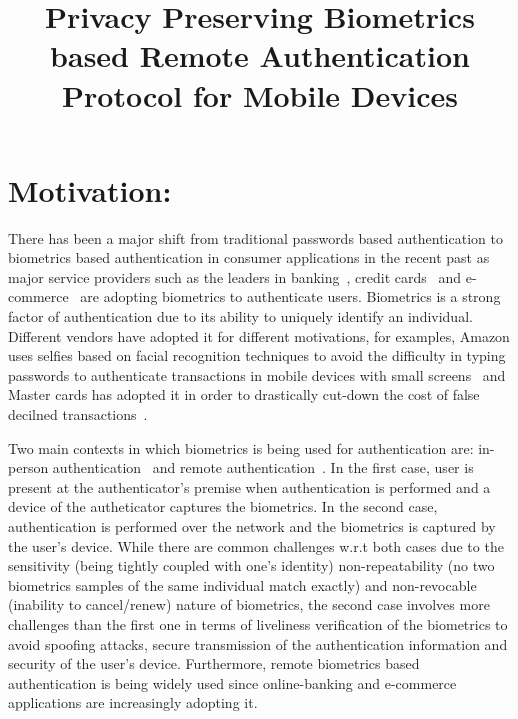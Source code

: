 \documentclass[10pt]{article}
\title{
\vspace{-20.mm}
Privacy Preserving Biometrics based Remote Authentication Protocol for Mobile Devices}
\begin{document}
\maketitle
\section{Motivation:}
There has been a major shift from traditional passwords based authentication to biometrics based authentication in consumer applications in the 
recent past as major service providers such as the leaders in banking~\cite{citi, hsbc, usaa}, credit cards~\cite{mastercard} and 
e-commerce~\cite{amazon, alibaba} are adopting biometrics to authenticate users.
Biometrics is a strong factor of authentication due to its ability to uniquely identify an individual. Different 
vendors have adopted it for different motivations, for examples, Amazon uses selfies based on facial recognition techniques to avoid the difficulty 
in typing passwords to authenticate transactions in mobile devices with small screens~\cite{amazon} and  Master cards has adopted it in order to 
drastically cut-down the cost of false decilned transactions~\cite{mastercard}.

Two main contexts in which biometrics is being used for authentication are: in-person authentication~\cite{google} and remote 
authentication~\cite{hsbc}. In the first case, user is present at the authenticator's premise when authentication is performed and a device of the 
autheticator captures the 
biometrics. In the second case, authentication is performed over the network and the biometrics is captured by the user's device. 
While there are common challenges w.r.t both cases due to the sensitivity (being tightly coupled with one's identity) non-repeatability (no 
two biometrics samples of the same individual match exactly) and non-revocable (inability to cancel/renew) nature of biometrics, the second case 
involves more challenges than the first one in terms of liveliness verification of the biometrics to avoid spoofing attacks, secure 
transmission of the authentication information and security of the user's device. Furthermore, remote biometrics based authentication is being widely 
used since online-banking and e-commerce applications are increasingly adopting it.
\end{document}
